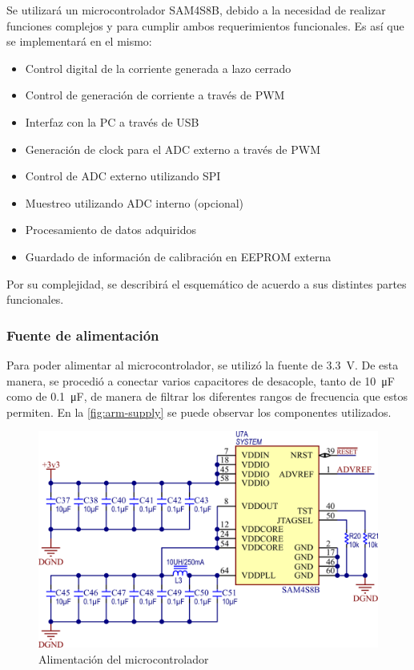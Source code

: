 \documentclass[../et.tex]{subfiles}
\begin{document}
Se utilizará un microcontrolador SAM4S8B, debido a la necesidad de realizar funciones complejos y para cumplir ambos requerimientos funcionales. Es así que se implementará en el mismo:

\begin{itemize}
  \item Control digital de la corriente generada a lazo cerrado
  \item Control de generación de corriente a través de PWM
  \item Interfaz con la PC a través de USB
  \item Generación de clock para el ADC externo a través de PWM
  \item Control de ADC externo utilizando SPI
  \item Muestreo utilizando ADC interno (opcional)
  \item Procesamiento de datos adquiridos
  \item Guardado de información de calibración en EEPROM externa
\end{itemize}

Por su complejidad, se describirá el esquemático de acuerdo a sus distintes partes funcionales.

\subsubsection{Fuente de alimentación}
Para poder alimentar al microcontrolador, se utilizó la fuente de \SI{3.3}{V}. De esta manera, se procedió a conectar varios capacitores de desacople, tanto de \SI{10}{\micro F} como de \SI{0.1}{\micro F}, de manera de filtrar los diferentes rangos de frecuencia que estos permiten. En la \autoref{fig:arm-supply} se puede observar los componentes utilizados.

\begin{figure}[!htbp]
  \centering
  \includegraphics[scale=1.5]{../images/arm-supply.png}
  \caption{Alimentación del microcontrolador}
  \label{fig:arm-supply}
\end{figure}
\end{document}
